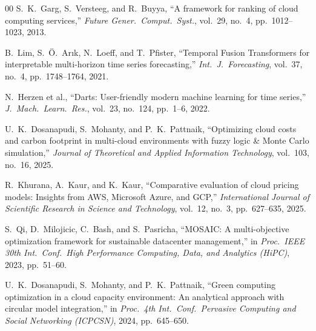 \documentclass[conference]{IEEEtran}
\begin{document}
\begin{thebibliography}{00}
 S.~K.~Garg, S.~Versteeg, and R.~Buyya, ``A framework for ranking of cloud computing services,'' \textit{Future Gener.\ Comput.\ Syst.}, vol.\ 29, no.\ 4, pp.\ 1012--1023, 2013.

 B.~Lim, S.~\"{O}.~Ar{\i}k, N.~Loeff, and T.~Pfister, ``Temporal Fusion Transformers for interpretable multi-horizon time series forecasting,'' \textit{Int.\ J.\ Forecasting}, vol.\ 37, no.\ 4, pp.\ 1748--1764, 2021.

 N.~Herzen et al., ``Darts: User-friendly modern machine learning for time series,'' \textit{J.\ Mach.\ Learn.\ Res.}, vol.\ 23, no.\ 124, pp.\ 1--6, 2022.

 U.~K.~Dosanapudi, S.~Mohanty, and P.~K.~Pattnaik, ``Optimizing cloud costs and carbon footprint in multi-cloud environments with fuzzy logic \& Monte Carlo simulation,'' \textit{Journal of Theoretical and Applied Information Technology}, vol.\ 103, no.\ 16, 2025.

 R.~Khurana, A.~Kaur, and K.~Kaur, ``Comparative evaluation of cloud pricing models: Insights from AWS, Microsoft Azure, and GCP,'' \textit{International Journal of Scientific Research in Science and Technology}, vol.\ 12, no.\ 3, pp.\ 627--635, 2025.

 S.~Qi, D.~Milojicic, C.~Bash, and S.~Pasricha, ``MOSAIC: A multi-objective optimization framework for sustainable datacenter management,'' in \textit{Proc.\ IEEE 30th Int.\ Conf.\ High Performance Computing, Data, and Analytics (HiPC)}, 2023, pp.\ 51--60.

 U.~K.~Dosanapudi, S.~Mohanty, and P.~K.~Pattnaik, ``Green computing optimization in a cloud capacity environment: An analytical approach with circular model integration,'' in \textit{Proc.\ 4th Int.\ Conf.\ Pervasive Computing and Social Networking (ICPCSN)}, 2024, pp.\ 645--650.

\end{thebibliography}
\end{document}
